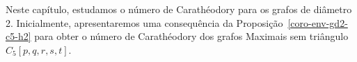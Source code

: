 




Neste capítulo, estudamos o número de Carathéodory para os grafos de diâmetro 2. Inicialmente, apresentaremos uma consequência da Proposição~\ref{coro-env-gd2-c5-h2} para obter o número de Carathéodory dos grafos Maximais sem triângulo $C_5[p,q,r,s,t]$.


